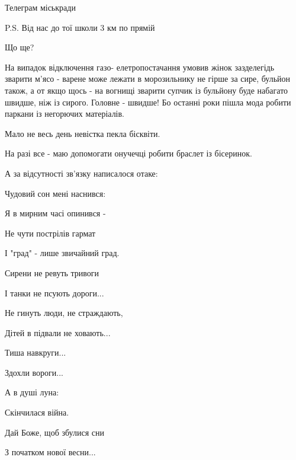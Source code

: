 Телеграм міськради 

P.S. Від нас до тої школи 3 км по прямій

Що ще? 

На випадок відключення газо- елетропостачання умовив жінок зазделегідь зварити
м'ясо - варене може лежати в морозильнику не гірше за сире, бульйон також, а от
якщо щось - на вогнищі зварити супчик із бульйону буде набагато швидше, ніж із
сирого.  Головне - швидше! Бо останні роки пішла мода робити паркани із
негорючих матеріалів.

Мало не весь день невістка пекла бісквіти.

На разі все - маю допомогати онучечці робити браслет із бісеринок.

А за відсутності зв'язку написалося отаке:

Чудовий сон мені наснився:

Я в мирним часі опинився -

Не чути пострілів гармат

І "град" - лише звичайний град.

Сирени не ревуть тривоги

І танки не псують дороги...

Не гинуть люди, не страждають,

Дітей в підвали не ховають...

Тиша навкруги...

Здохли вороги...

А в душі луна:

Скінчилася війна.

Дай Боже, щоб збулися сни

З початком нової весни...

